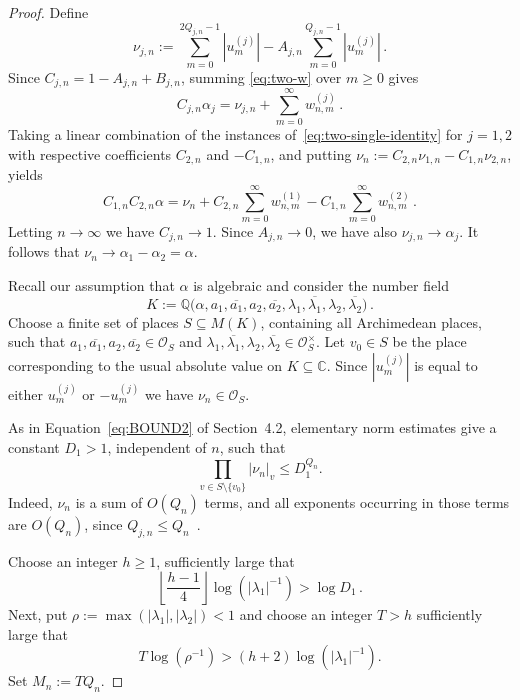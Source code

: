 \documentclass[a4paper,UKenglish,cleveref, autoref, thm-restate]{lipics-v2021}
\begin{document}
\begin{proof}
Define
\[
  \nu_{j,n}
  :=
  \sum_{m=0}^{2Q_{j,n}-1}|u_m^{(j)}|
  -
  A_{j,n}
  \sum_{m=0}^{Q_{j,n}-1}|u_m^{(j)}| \, .
\]
Since $C_{j,n}=1-A_{j,n}+B_{j,n}$,
summing \eqref{eq:two-w} over \(m\ge0\) gives
\begin{equation}\label{eq:two-single-identity}
  C_{j,n}\alpha_j
  =
  \nu_{j,n}
  +
  \sum_{m=0}^{\infty}w_{n,m}^{(j)}\, .
\end{equation}
Taking  a linear combination of the instances of~\eqref{eq:two-single-identity} for $j=1,2$ with respective 
coefficients $C_{2,n}$ and $-C_{1,n}$, and putting $\nu_n := C_{2,n}\nu_{1,n} -
  C_{1,n}\nu_{2,n}$, yields
\begin{equation}\label{eq:two-master}
  C_{1,n}C_{2,n}\alpha
 =  \nu_n + C_{2,n}  \sum_{m=0}^{\infty}w_{n,m}^{(1)} - C_{1,n}  \sum_{m=0}^{\infty}w_{n,m}^{(2)}\, .
\end{equation}
Letting $n\rightarrow\infty$ we have \(C_{j,n}\to1\).  Since $A_{j,n}\rightarrow 0$, we have also
\(\nu_{j,n}\to\alpha_j\).  It follows that
\(
  \nu_n\longrightarrow\alpha_1-\alpha_2=\alpha
\).

Recall our assumption that \(\alpha\) is algebraic and consider the number field
\[
  K
  :=
  \mathbb Q\big(
    \alpha,
    a_1,\overline{a_1},a_2,\overline{a_2},
    \lambda_1,\overline{\lambda_1},
    \lambda_2,\overline{\lambda_2}
  \big) \, .
\]
Choose a finite set of places \(S\subseteq M(K)\), containing all Archimedean
places, such that
\(
  a_1,\overline{a_1},a_2,\overline{a_2}\in\mathcal O_S
\)
and
\(
  \lambda_1,\overline{\lambda_1},
  \lambda_2,\overline{\lambda_2}
  \in\mathcal O_S^\times
\).
Let \(v_0\in S\) be the place corresponding to the usual absolute value
on \(K\subseteq\mathbb C\).
Since \(|u_m^{(j)}|\) is equal to either
\(u_m^{(j)}\) or \(-u_m^{(j)}\) we have 
 \( \nu_n\in\mathcal O_S\).
 
As in Equation~\eqref{eq:BOUND2} of Section~4.2, elementary norm estimates give a
constant \(D_1>1\), independent of \(n\), such that
\begin{equation}\label{eq:two-local-estimate}
  \prod_{v\in S\setminus\{v_0\}}
  |\nu_n|_v
  \le D_1^{Q_n}.
\end{equation}
Indeed, \(\nu_n\) is a sum of \(O(Q_n)\) terms, and all exponents
occurring in those terms are \(O(Q_n)\), since
\(Q_{j,n}\le Q_n\)\, .


Choose an integer \(h\ge1\), sufficiently large that
\begin{equation}\label{eq:two-choose-h}
 \left\lfloor \frac{h-1}{4} \right\rfloor \log(|\lambda_1|^{-1})>\log D_1\, .
\end{equation}
Next, put $\rho:=\max(|\lambda_1|,|\lambda_2|)<1$
and choose an integer \(T>h\) sufficiently large that
\begin{equation}\label{eq:two-choose-T}
  T\log(\rho^{-1})
  >
  (h+2)\log(|\lambda_1|^{-1}).
\end{equation}
Set
\(
  M_n:=TQ_n.
\)


\end{proof}
\end{document}
